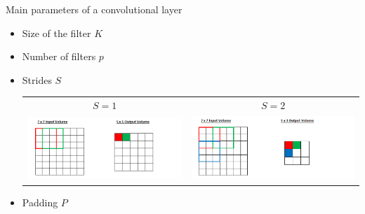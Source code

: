 \documentclass[handout, 10pt]{beamer}
\begin{document}
\begin{frame}[t]{Main parameters of a convolutional layer}
\begin{itemize}
    \item <1-> \alert<1> {Size of the filter} $K$ 
    \item <2-> \alert<2> {Number of filters} $p$


    \item <3-> \alert<3> {Strides} $S$
    
     {
{\centering
\begin{tabular}{cc}
    $S=1$ & $S=2$ \\
    \includegraphics[trim={0.5cm 0 2.5cm 0}, clip, width=.5\textwidth]{fig/L2/Stride1.png}&
    \includegraphics[trim={0 0 2.5cm 0}, clip, width=.5\textwidth]{fig/L2/Stride2.png}\\
    \end{tabular}
    }}
    
    \item <4-> \alert<4> {Padding} $P$
    

\end{itemize}
\end{frame}
\end{document}
